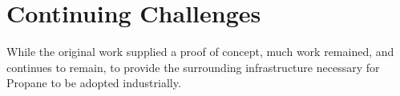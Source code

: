 \documentclass[10pt]{sigalternate052015}
\begin{document}



\section{Continuing Challenges}

While the original work supplied a proof of concept, much work
remained, and continues to remain, to provide the surrounding
infrastructure necessary for Propane to be adopted industrially.
\end{document}

